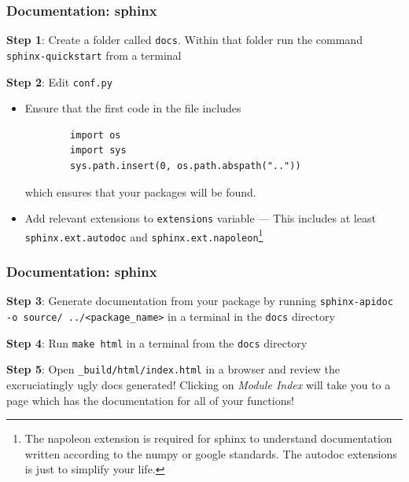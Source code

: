 \documentclass[10pt]{beamer}
\begin{document}
  \begin{frame}[fragile] \frametitle{Documentation: sphinx}

    \textbf{Step 1}: Create a folder called \texttt{docs}. Within that folder run the
    command \texttt{sphinx-quickstart} from a terminal

    \vspace{0.25cm}

    \textbf{Step 2}: Edit \texttt{conf.py}
    \begin{itemize}
      \item Ensure that the first code in the file includes
        \begin{lstlisting}
        import os
        import sys
        sys.path.insert(0, os.path.abspath(".."))
        \end{lstlisting}
        which ensures that your packages will be found.
      \item Add relevant extensions to \texttt{extensions} variable ---
        This includes at least \texttt{sphinx.ext.autodoc} and
        \texttt{sphinx.ext.napoleon}\footnote{The napoleon extension is required for
        sphinx to understand documentation written according to the numpy or google
        standards. The autodoc extensions is just to simplify your life.}
    \end{itemize}

  \end{frame}

  \begin{frame} \frametitle{Documentation: sphinx}

     \textbf{Step 3}: Generate documentation from your package by running
     \texttt{sphinx-apidoc -o source/  ../<package\_name>} in a terminal in
     the \texttt{docs} directory

     \vspace{0.25cm}

     \textbf{Step 4}: Run \texttt{make html} in a terminal from the \texttt{docs}
     directory

     \vspace{0.25cm}

     \textbf{Step 5}: Open \texttt{\_build/html/index.html} in a browser and review the
     excruciatingly ugly docs generated! Clicking on \textit{Module Index} will take you
     to a page which has the documentation for all of your functions!

  \end{frame}
\end{document}
